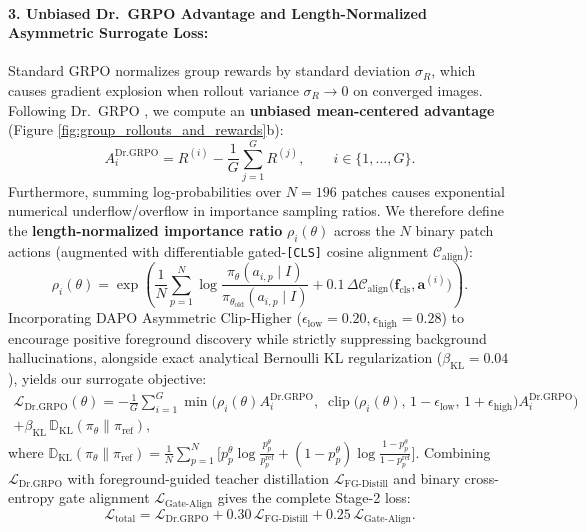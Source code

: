 \documentclass[11pt,a4paper]{article}
\begin{document}
\paragraph{3. Unbiased Dr.\ GRPO Advantage and Length-Normalized Asymmetric Surrogate Loss:}
Standard GRPO \cite{shao2024deepseekmath} normalizes group rewards by standard deviation $\sigma_R$, which causes gradient explosion when rollout variance $\sigma_R \to 0$ on converged images. Following Dr.\ GRPO \cite{liu2025drgrpo}, we compute an \textbf{unbiased mean-centered advantage} (Figure \ref{fig:group_rollouts_and_rewards}b):
\begin{equation}
A_i^{\text{Dr.GRPO}} = R^{(i)} - \frac{1}{G}\sum_{j=1}^G R^{(j)}, \qquad i \in \{1, \dots, G\}.
\label{eq:unbiased_advantage}
\end{equation}
Furthermore, summing log-probabilities over $N=196$ patches causes exponential numerical underflow/overflow in importance sampling ratios. We therefore define the \textbf{length-normalized importance ratio} $\rho_i(\theta)$ across the $N$ binary patch actions (augmented with differentiable gated-\texttt{[CLS]} cosine alignment $\mathcal{C}_{\text{align}}$):
\begin{equation}
\rho_i(\theta) = \exp\!\left(\frac{1}{N}\sum_{p=1}^N \log \frac{\pi_\theta(a_{i,p} \mid I)}{\pi_{\theta_{\text{old}}}(a_{i,p} \mid I)} + 0.1\,\Delta \mathcal{C}_{\text{align}}\big(\mathbf{f}_{\text{cls}}, \mathbf{a}^{(i)}\big)\right).
\label{eq:length_norm_logprob}
\end{equation}
Incorporating DAPO Asymmetric Clip-Higher \cite{yu2025dapo} ($\epsilon_{\text{low}} = 0.20, \epsilon_{\text{high}} = 0.28$) to encourage positive foreground discovery while strictly suppressing background hallucinations, alongside exact analytical Bernoulli KL regularization ($\beta_{\text{KL}} = 0.04$), yields our surrogate objective:
\begin{multline}
\mathcal{L}_{\text{Dr.GRPO}}(\theta) = -\frac{1}{G}\sum_{i=1}^G \min\!\Big(\rho_i(\theta) A_i^{\text{Dr.GRPO}}, \; \operatorname{clip}\!\big(\rho_i(\theta), \, 1-\epsilon_{\text{low}}, \, 1+\epsilon_{\text{high}}\big) A_i^{\text{Dr.GRPO}}\Big) \\
+ \beta_{\text{KL}}\,\mathbb{D}_{\text{KL}}\!\left(\pi_\theta \parallel \pi_{\text{ref}}\right),
\label{eq:drgrpo_objective}
\end{multline}
where $\mathbb{D}_{\text{KL}}(\pi_\theta \parallel \pi_{\text{ref}}) = \frac{1}{N}\sum_{p=1}^N \big[p_p^\theta \log\frac{p_p^\theta}{p_p^{\text{ref}}} + (1-p_p^\theta)\log\frac{1-p_p^\theta}{1-p_p^{\text{ref}}}\big]$. Combining $\mathcal{L}_{\text{Dr.GRPO}}$ with foreground-guided teacher distillation $\mathcal{L}_{\text{FG-Distill}}$ and binary cross-entropy gate alignment $\mathcal{L}_{\text{Gate-Align}}$ gives the complete Stage-2 loss:
\begin{equation}
\mathcal{L}_{\text{total}} = \mathcal{L}_{\text{Dr.GRPO}} + 0.30\,\mathcal{L}_{\text{FG-Distill}} + 0.25\,\mathcal{L}_{\text{Gate-Align}}.
\label{eq:total_grpo_loss}
\end{equation}
\end{document}
